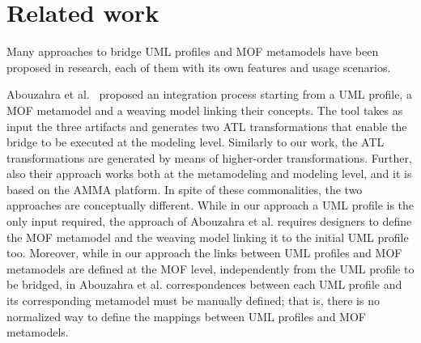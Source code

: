 \section{Related work}\label{sec:related}
Many approaches to bridge UML profiles and MOF metamodels have been proposed in research, each of them with its own features and usage scenarios. 

Abouzahra et al.~\cite{Abouzahra} proposed an integration process starting from a UML profile, a MOF metamodel and a weaving model linking their concepts.
The tool takes as input the three artifacts and generates two ATL transformations that enable the bridge to be executed at the modeling level. Similarly to our work, the ATL transformations are generated by means of higher-order transformations. Further, also their approach works both at the metamodeling and modeling level, and it is based on the AMMA platform. In spite of these commonalities, the two approaches are conceptually different. While in our approach a UML profile is the only input required, the approach of Abouzahra et al. requires designers to define the MOF metamodel and the weaving model linking it to the initial UML profile too.
Moreover, while in our approach the links between UML profiles and MOF metamodels are defined at the MOF level, independently from the UML profile to be bridged, in Abouzahra et al. correspondences between each UML profile and its corresponding metamodel must be manually defined; that is, there is no normalized way to define the mappings between UML profiles and MOF metamodels.


